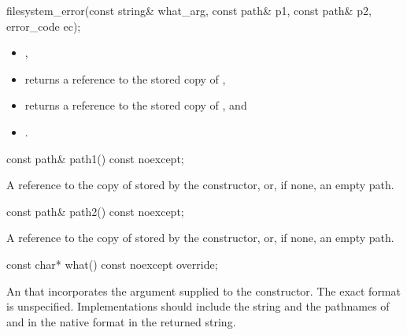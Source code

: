 %
\begin{itemdecl}
filesystem_error(const string& what_arg, const path& p1, const path& p2, error_code ec);
\end{itemdecl}

\begin{itemdescr}
\pnum
\ensures
\begin{itemize}
\item {},
\item {} returns a reference to the stored copy of ,
\item {} returns a reference to the stored copy of , and
\item {} .
\end{itemize}
\end{itemdescr}

%
\begin{itemdecl}
const path& path1() const noexcept;
\end{itemdecl}

\begin{itemdescr}
\pnum
\returns
A reference to the copy of  stored by the
  constructor, or, if none, an empty path.
\end{itemdescr}

%
\begin{itemdecl}
const path& path2() const noexcept;
\end{itemdecl}

\begin{itemdescr}
\pnum
\returns
A reference to the copy of  stored by the
  constructor, or, if none, an empty path.
\end{itemdescr}

%
\begin{itemdecl}
const char* what() const noexcept override;
\end{itemdecl}

\begin{itemdescr}
\pnum
\returns
An \ntbs{} that incorporates
  the  argument supplied to the constructor.
  The exact format is unspecified.
  Implementations should include
  the  string and
  the pathnames of  and 
  in the native format in the returned string.
\end{itemdescr}

